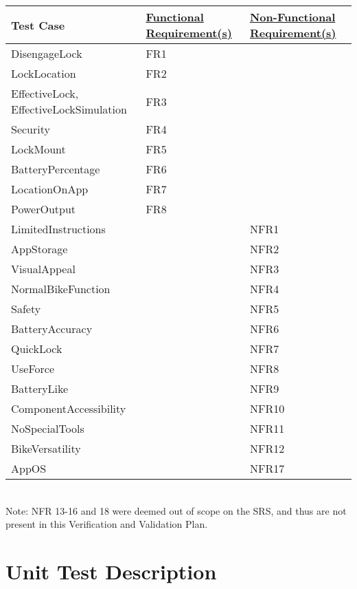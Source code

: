 \documentclass[12pt, titlepage]{article}
\begin{document}
\begin{minipage}{\textwidth}
\footnotesize
{}
\renewcommand*{\arraystretch}{1.5}
\begin{tabular}{| p{} | p{} | p{} |}
 \hline
 Test Case & \href{https://github.com/NevoAbigail/Capstone/blob/main/docs/SRS/SRS.pdf}{Functional Requirement(s)} & \href{https://github.com/NevoAbigail/Capstone/blob/main/docs/SRS/SRS.pdf}{Non-Functional Requirement(s)} \\ 
 \hline
 DisengageLock & FR1 &  \\ 
  \hline
 LockLocation & FR2 &  \\ 
  \hline
 EffectiveLock, EffectiveLockSimulation & FR3 &  \\ 
  \hline
 Security & FR4 &  \\ 
  \hline
 LockMount & FR5 &  \\ 
  \hline
 BatteryPercentage & FR6 &  \\ 
  \hline
 LocationOnApp & FR7 &  \\ 
  \hline
 PowerOutput & FR8 &  \\ 
  \hline
 LimitedInstructions & & NFR1 \\
 \hline
  AppStorage & & NFR2 \\
 \hline
  VisualAppeal & & NFR3 \\
 \hline
  NormalBikeFunction & & NFR4 \\
 \hline
  Safety & & NFR5 \\
 \hline
  BatteryAccuracy & & NFR6 \\
 \hline
  QuickLock & & NFR7 \\
 \hline
 UseForce & & NFR8 \\
 \hline
 BatteryLike & & NFR9 \\
 \hline
  ComponentAccessibility & & NFR10 \\
 \hline
  NoSpecialTools & & NFR11 \\
 \hline
  BikeVersatility & & NFR12 \\
 \hline
  AppOS & & NFR17 \\
 \hline
 \end{tabular}
\end{minipage}\\

Note: NFR 13-16 and 18 were deemed out of scope on the SRS, and thus are not present in this Verification and Validation Plan. 

\section{Unit Test Description}
\label{Section 6}
\end{document}
